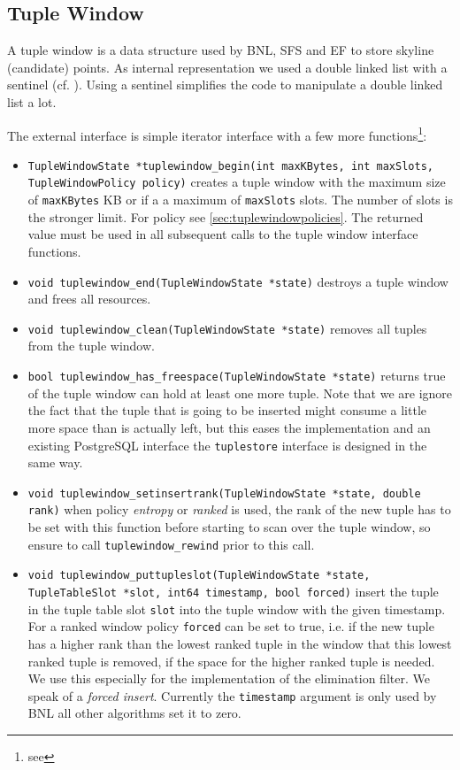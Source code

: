 \subsection{Tuple Window}
A tuple window is a data structure used by BNL, SFS and EF to store
skyline (candidate) points. As internal representation we used a double
linked list with a sentinel (cf. \citep[Page 204--209]{Cormen2001}).
Using a sentinel simplifies the code to manipulate a double linked
list a lot.

The external interface is simple iterator interface with a few more
functions\footnote{see }:

\begin{itemize}
\item \lstinline|TupleWindowState *tuplewindow_begin(int maxKBytes, int maxSlots, TupleWindowPolicy policy)|
creates a tuple window with the maximum size of \lstinline|maxKBytes|
KB or if a a maximum of \lstinline|maxSlots| slots. The number of
slots is the stronger limit. For policy see
\autoref{sec:tuplewindowpolicies}.  The returned value must be
used in all subsequent calls to the tuple window interface functions.

\item \lstinline|void tuplewindow_end(TupleWindowState *state)| 
destroys a tuple window and frees all resources.

\item \lstinline|void tuplewindow_clean(TupleWindowState *state)|
removes all tuples from the tuple window.

\item \lstinline|bool tuplewindow_has_freespace(TupleWindowState *state)|
returns true of the tuple window can hold at least one more tuple.
Note that we are ignore the fact that the tuple that is going to be
inserted might consume a little more space than is actually left, but
this eases the implementation and an existing PostgreSQL interface the
\lstinline|tuplestore| interface is designed in the same way.

\item \lstinline|void tuplewindow_setinsertrank(TupleWindowState *state, double rank)|
when policy \emph{entropy} or \emph{ranked} is used, the rank of the
new tuple has to be set with this function before starting to scan
over the tuple window, so ensure to call
\lstinline|tuplewindow_rewind| prior to this call.

\item \lstinline|void tuplewindow_puttupleslot(TupleWindowState *state, TupleTableSlot *slot, int64 timestamp, bool forced)|
insert the tuple in the tuple table slot \lstinline|slot| into the
tuple window with the given timestamp.  For a ranked window policy
\lstinline|forced| can be set to true, i.e. if the new tuple has a
higher rank than the lowest ranked tuple in the window that this
lowest ranked tuple is removed, if the space for the higher ranked
tuple is needed.  We use this especially for the implementation of the
elimination filter. We speak of a \emph{forced insert}.  Currently the \lstinline|timestamp| argument is only used
by BNL all other algorithms set it to zero.


\end{itemize}
